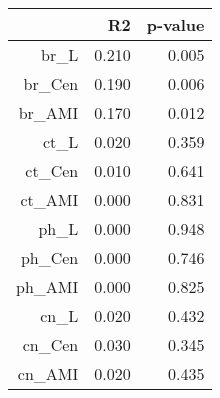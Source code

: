 \begin{table}[ht]
\centering
\begin{tabular}{rrr}
  \hline
 & R2 & p-value \\ 
  \hline
br\_L & 0.210 & 0.005 \\ 
  br\_Cen & 0.190 & 0.006 \\ 
  br\_AMI & 0.170 & 0.012 \\ 
  ct\_L & 0.020 & 0.359 \\ 
  ct\_Cen & 0.010 & 0.641 \\ 
  ct\_AMI & 0.000 & 0.831 \\ 
  ph\_L & 0.000 & 0.948 \\ 
  ph\_Cen & 0.000 & 0.746 \\ 
  ph\_AMI & 0.000 & 0.825 \\ 
  cn\_L & 0.020 & 0.432 \\ 
  cn\_Cen & 0.030 & 0.345 \\ 
  cn\_AMI & 0.020 & 0.435 \\ 
   \hline
\end{tabular}
\end{table}
